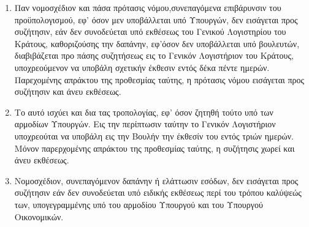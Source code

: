 \documentclass[twoside, a4paper, 10pt]{article}
\begin{document}
\begin{multicols}{2}
\begin{enumerate}
\begin{BigQuote}
\begin{enumerate}
  \item[1.] Παν νομοσχέδιον και πάσα πρότασις νόμου,συνεπαγόμενα επιβάρυνσιν του προϋπολογισμού, εφ' όσον μεν υποβάλλεται υπό Υπουργών, δεν εισάγεται προς συζήτησιν, εάν δεν συνοδεύεται υπό εκθέσεως του Γενικού Λογιστηρίου του Κράτους, καθοριζούσης την δαπάνην, εφ'όσον δεν υποβάλλεται υπό βουλευτών, διαβιβάζεται προ πάσης συζητήσεως εις το Γενικόν Λογιστήριον του Κράτους, υποχρεούμενον να υποβάλη σχετικήν έκθεσιν εντός δέκα πέντε ημερών. Παρεχομένης απράκτου της προθεσμίας ταύτης, η πρότασις νόμου εισάγεται προς συζήτησιν και άνευ εκθέσεως.
  \item[2.] Το αυτό ισχύει και δια τας τροπολογίας, εφ' όσον ζητηθή τούτο υπό των αρμοδίων Υπουργών. Εις την περίπτωσιν ταύτην  το Γενικόν Λογιστήριον υποχρεούται να υποβάλη εις την Βουλήν την έκθεσίν του εντός τριών ημερών. Μόνον παρερχομένης απράκτου της προθεσμίας ταύτης, η συζήτησις χωρεί και άνευ εκθέσεως.
  \item[3.] Νομοσχέδιον, συνεπαγόμενον δαπάνην ή ελάττωσιν εσόδων, δεν εισάγεται προς συζήτησιν εάν δεν συνοδεύεται υπό ειδικής εκθέσεως περί του τρόπου καλύψεώς των, υπογεγραμμένης υπό του αρμοδίου Υπουργού και του Υπουργού Οικονομικών.
\end{enumerate}


\end{BigQuote}
\end{enumerate}
\end{multicols}
\end{document}
